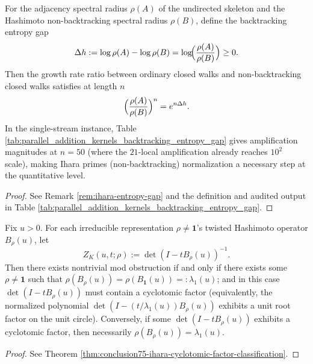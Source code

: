 \begin{conclusion}\label{con:xi-terminal-backtracking-entropy-gap-exponential}
For the adjacency spectral radius \(\rho(A)\) of the undirected skeleton and the Hashimoto non-backtracking spectral radius \(\rho(B)\), define the backtracking entropy gap
\[
\Delta h:=\log\rho(A)-\log\rho(B)=\log\!\Bigl(\frac{\rho(A)}{\rho(B)}\Bigr)\ge 0.
\]
Then the growth rate ratio between ordinary closed walks and non-backtracking closed walks satisfies at length \(n\)
\[
\Bigl(\frac{\rho(A)}{\rho(B)}\Bigr)^n=e^{n\Delta h}.
\]
In the single-stream instance, Table \ref{tab:parallel_addition_kernels_backtracking_entropy_gap} gives amplification magnitudes at \(n=50\) (where the \(21\)-local amplification already reaches \(10^2\) scale), making Ihara primes (non-backtracking) normalization a necessary step at the quantitative level.
\end{conclusion}
\begin{proof}[Proof]
See Remark \ref{rem:ihara-entropy-gap} and the definition and audited output in Table \ref{tab:parallel_addition_kernels_backtracking_entropy_gap}.
\end{proof}

\begin{conclusion}\label{con:xi-terminal-mod-obstruction-cyclotomic}
Fix \(u>0\).
For each irreducible representation \(\rho\neq\mathbf 1\)'s twisted Hashimoto operator \(B_\rho(u)\), let
\[
Z_K(u,t;\rho):=\det(I-tB_\rho(u))^{-1}.
\]
Then there exists nontrivial mod obstruction if and only if there exists some \(\rho\neq\mathbf 1\) such that \(\rho(B_\rho(u))=\rho(B_{\mathbf 1}(u))=:\lambda_1(u)\); and in this case \(\det(I-tB_\rho(u))\) must contain a cyclotomic factor (equivalently, the normalized polynomial \(\det(I-(t/\lambda_1(u))B_\rho(u))\) exhibits a unit root factor on the unit circle).
Conversely, if some \(\det(I-tB_\rho(u))\) exhibits a cyclotomic factor, then necessarily \(\rho(B_\rho(u))=\lambda_1(u)\).
\end{conclusion}
\begin{proof}[Proof]
See Theorem \ref{thm:conclusion75-ihara-cyclotomic-factor-classification}.
\end{proof}

